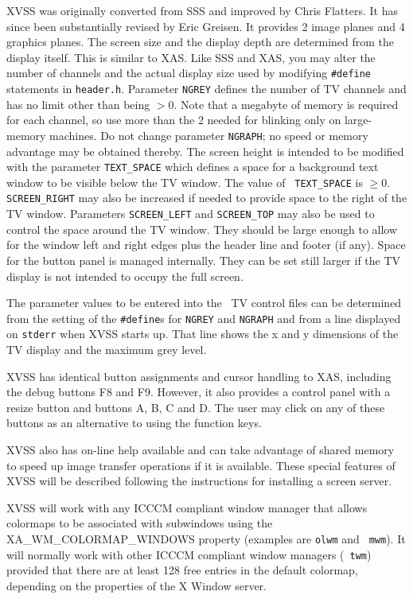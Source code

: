 XVSS was originally converted from SSS and improved by Chris Flatters.
It has since been substantially revised by Eric Greisen.  It provides
2 image planes and 4 graphics planes.  The screen size and the display
depth are determined from the display itself.  This is similar to
\hbox{XAS}.  Like SSS and XAS, you may alter the number of channels
and the actual display size used by modifying {\tt \#define}
statements in {\tt header.h}.  Parameter {\tt NGREY} defines the
number of TV channels and has no limit other than being $> 0$.  Note
that a megabyte of memory is required for each channel, so use more
than the 2 needed for blinking only on large-memory machines.  Do not
change parameter {\tt NGRAPH}; no speed or memory advantage may be
obtained thereby.  The screen height is intended to be modified with
the parameter {\tt TEXT\_SPACE} which defines a space for a background
text window to be visible below the TV window.  The value of {\tt
TEXT\_SPACE} is $\ge 0$.  {\tt SCREEN\_RIGHT} may also be increased if
needed to provide space to the right of the TV window.  Parameters
{\tt SCREEN\_LEFT} and {\tt SCREEN\_TOP} may also be used to control
the space around the TV window.  They should be large enough to allow
for the window left and right edges plus the header line and footer
(if any).  Space for the button panel is managed internally.  They can
be set still larger if the TV display is not intended to occupy the
full screen.

The parameter values to be entered into the \AIPS\ TV control files
can be determined from the setting of the {\tt \#define}s for
{\tt NGREY} and {\tt NGRAPH} and from a line displayed on {\tt stderr}
when XVSS starts up.  That line shows the x and y dimensions of the TV
display and the maximum grey level.

XVSS has identical button assignments and cursor handling to XAS,
including the debug buttons F8 and F9.  However, it also provides a
control panel with a resize button and buttons A, B, C and \hbox{D}.
The user may click on any of these buttons as an alternative to using
the function keys.

XVSS also has on-line help available and can take advantage of shared
memory to speed up image transfer operations if it is available.
These special features of XVSS will be described following the
instructions for installing a screen server.

XVSS will work with any ICCCM compliant window manager that allows
colormaps to be associated with subwindows using the
XA\_WM\_COLORMAP\_WINDOWS property (examples are {\tt olwm} and {\tt
mwm}).  It will normally work with other ICCCM compliant window
managers (\eg\ {\tt twm}) provided that there are at least 128 free
entries in the default colormap, depending on the properties of the X
Window server.

